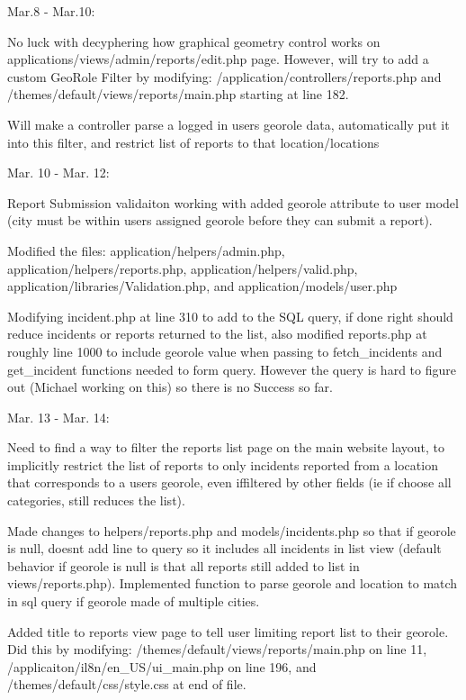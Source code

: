\documentclass{article}
\begin{document}
Mar.8 - Mar.10:

    No luck with decyphering how graphical geometry control works on applications/views/admin/reports/edit.php 
    page. However, will try to add a custom GeoRole Filter by modifying: /application/controllers/reports.php
    and /themes/default/views/reports/main.php starting at line 182.

    Will make a controller parse a logged in users georole data, automatically put it into this filter,
    and restrict list of reports to that location/locations

Mar. 10 - Mar. 12:

    Report Submission validaiton working with added georole attribute to user model
    (city must be within users assigned georole before they can submit a report).

    Modified the files: application/helpers/admin.php, application/helpers/reports.php,
 	application/helpers/valid.php, application/libraries/Validation.php, and application/models/user.php
 	   
 	Modifying incident.php at line 310 to add to the SQL query, if done right should
 	reduce incidents or reports returned to the list, also modified reports.php at roughly
 	line 1000 to include georole value when passing to fetch_incidents and get_incident functions
 	needed to form query.  However the query is hard to figure out (Michael working on this) so there
 	is no Success so far.
 	     
Mar. 13 - Mar. 14:
            
    Need to find a way to filter the reports list page on the main website layout, to implicitly
    restrict the list of reports to only incidents reported from a location that corresponds to a users 
    georole, even iffiltered by other fields (ie if choose all categories, still reduces the list).
         
    Made changes to helpers/reports.php and models/incidents.php so that if georole is null, doesnt add line 
    to query so it includes all incidents in list view (default behavior if georole is null is that all reports 
    still added to list in views/reports.php). Implemented function to parse georole and location to match in 
    sql query if georole made of multiple cities.
              
    Added title to reports view page to tell user limiting report list to their georole. Did this by modifying:
    /themes/default/views/reports/main.php on line 11, /applicaiton/il8n/en_US/ui_main.php on line 196, and            
    /themes/default/css/style.css at end of file.
                
\end{document}
